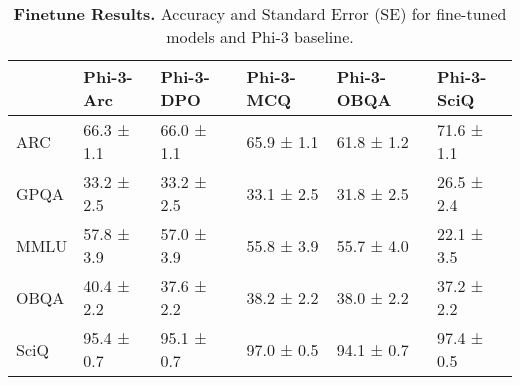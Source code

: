 
\begin{table}[H]
\centering
\caption{\textbf{Finetune Results.} Accuracy and Standard Error (SE) for fine-tuned models and Phi-3 baseline.}
\label{tab:finetune-benchmark}
\begin{tabular}{llllll}
\toprule
 & Phi-3-Arc & Phi-3-DPO & Phi-3-MCQ & Phi-3-OBQA & Phi-3-SciQ \\
\midrule
ARC & 66.3 ± 1.1 & 66.0 ± 1.1 & 65.9 ± 1.1 & 61.8 ± 1.2 & 71.6 ± 1.1 \\
GPQA & 33.2 ± 2.5 & 33.2 ± 2.5 & 33.1 ± 2.5 & 31.8 ± 2.5 & 26.5 ± 2.4 \\
MMLU & 57.8 ± 3.9 & 57.0 ± 3.9 & 55.8 ± 3.9 & 55.7 ± 4.0 & 22.1 ± 3.5 \\
OBQA & 40.4 ± 2.2 & 37.6 ± 2.2 & 38.2 ± 2.2 & 38.0 ± 2.2 & 37.2 ± 2.2 \\
SciQ & 95.4 ± 0.7 & 95.1 ± 0.7 & 97.0 ± 0.5 & 94.1 ± 0.7 & 97.4 ± 0.5 \\
\bottomrule
\end{tabular}
\end{table}
